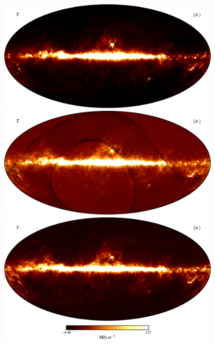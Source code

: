 \documentclass{aa}
\begin{document}
\begin{figure}
	\centering
        \includegraphics[width=0.6\linewidth]{figs/CG_DIRBE_08_n0512_v05_I_MEAN_w18_n512_c-afmhot.pdf}\\
        \includegraphics[width=0.6\linewidth]{figs/CG_DIRBE_09_n0512_v05_I_MEAN_w18_n512_c-afmhot.pdf}\\
        \includegraphics[width=0.6\linewidth]{figs/CG_DIRBE_10_n0512_v05_I_MEAN_w18_n512_cb_c-afmhot.pdf}
	\caption{}
	\label{fig:freqmaps8_10}
\end{figure}
\end{document}
